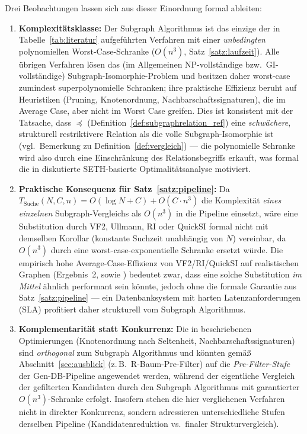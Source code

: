 \documentclass[a4paper,12pt]{article}
\theoremstyle{definition}
\begin{document}
Drei Beobachtungen lassen sich aus dieser Einordnung formal ableiten:

\begin{enumerate}
	\item \textbf{Komplexitätsklasse:} Der Subgraph Algorithmus ist das einzige der in Tabelle~\ref{tab:literatur} aufgeführten Verfahren mit einer \emph{unbedingten} polynomiellen Worst-Case-Schranke ($O(n^3)$, Satz~\ref{satz:laufzeit}). Alle übrigen Verfahren lösen das (im Allgemeinen NP-vollständige bzw.\ GI-vollständige) Subgraph-Isomorphie-Problem und besitzen daher worst-case zumindest superpolynomielle Schranken; ihre praktische Effizienz beruht auf Heuristiken (Pruning, Knoten\-ordnung, Nachbarschaftssignaturen), die im Average Case, aber nicht im Worst Case greifen. Dies ist konsistent mit der Tatsache, dass $\preceq$ (Definition~\ref{def:subgraphrelation_ref}) eine \emph{schwächere}, strukturell restriktivere Relation als die volle Subgraph-Isomorphie ist (vgl.\ Bemerkung zu Definition~\ref{def:vergleich}) — die polynomielle Schranke wird also durch eine Einschränkung des Relationsbegriffs erkauft, was formal die in \cite{epp2026subgraph} diskutierte SETH-basierte Optimalitätsanalyse motiviert.
	\item \textbf{Praktische Konsequenz für Satz~\ref{satz:pipeline}:} Da $T_{\text{Suche}}(N,C,n)=O(\log N+C)+O(C\cdot n^3)$ die Komplexität \emph{eines einzelnen} Subgraph-Vergleichs als $O(n^3)$ in die Pipeline einsetzt, wäre eine Substitution durch VF2, Ullmann, RI oder QuickSI formal nicht mit demselben Korollar (konstante Suchzeit unabhängig von $N$) vereinbar, da $O(n^3)$ durch eine worst-case-exponentielle Schranke ersetzt würde. Die empirisch hohe Average-Case-Effizienz von VF2/RI/QuickSI auf realistischen Graphen (Ergebnis~2, sowie \cite{he2008,bonnici2013}) bedeutet zwar, dass eine solche Substitution \emph{im Mittel} ähnlich performant sein könnte, jedoch ohne die formale Garantie aus Satz~\ref{satz:pipeline} — ein Datenbanksystem mit harten Latenzanforderungen (SLA) profitiert daher strukturell vom Subgraph Algorithmus.
	\item \textbf{Komplementarität statt Konkurrenz:} Die in \cite{bonnici2013,he2008} beschriebenen Optimierungen (Knotenordnung nach Seltenheit, Nachbarschaftssignaturen) sind \emph{orthogonal} zum Subgraph Algorithmus und könnten gemäß Abschnitt~\ref{sec:ausblick} (z.\,B.\ R-Baum-Pre-Filter) auf die \emph{Pre-Filter-Stufe} der Gen-DB-Pipeline angewendet werden, während der eigentliche Vergleich der gefilterten Kandidaten durch den Subgraph Algorithmus mit garantierter $O(n^3)$-Schranke erfolgt. Insofern stehen die hier verglichenen Verfahren nicht in direkter Konkurrenz, sondern adressieren unterschiedliche Stufen derselben Pipeline (Kandidatenreduktion vs.\ finaler Strukturvergleich).
\end{enumerate}
\end{document}
